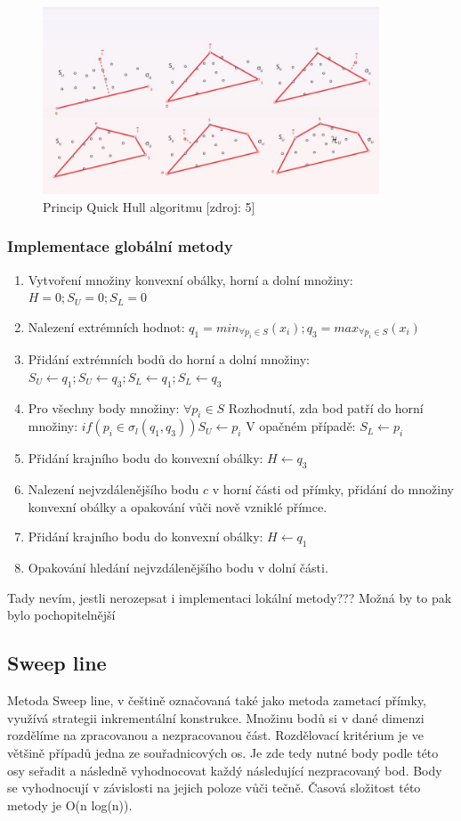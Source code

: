 \documentclass[a4paper, 12pt]{article}
\begin{document}
\begin{figure}[h!]
	\centering
	\includegraphics[width=10cm]{quickhull.jpg}
	\caption{Princip Quick Hull algoritmu [zdroj: 5]}
\end{figure}

\subsubsection{Implementace globální metody}
\begin{enumerate}
\item Vytvoření množiny konvexní obálky, horní a dolní množiny:  $H = 0; S_U = 0; S_L = 0 $ 
\item Nalezení extrémních hodnot:  $ q_1 =  min_{\forall p_i \in S}(x_i); q_3 =  max_{\forall p_i \in S}(x_i) $ 
\item Přidání extrémních bodů do horní a dolní množiny: $S_U \leftarrow q_1; S_U \leftarrow q_3; S_L \leftarrow q_1; S_L \leftarrow q_3 $
\item Pro všechny body množiny: $\forall p_i \in S  $
\subitem Rozhodnutí, zda bod patří do horní množiny: $ if(p_i \in \sigma_l(q_1, q_3)) S_U \leftarrow p_i  $
\subitem V opačném případě: $ S_L \leftarrow p_i  $
\item Přidání krajního bodu do konvexní obálky: $H \leftarrow q_3$
\item Nalezení nejvzdálenějšího bodu $c$ v horní části od přímky, přidání do množiny konvexní obálky a opakování vůči nově vzniklé přímce.
\item Přidání krajního bodu do konvexní obálky: $H \leftarrow q_1$
\item Opakování hledání nejvzdálenějšího bodu v dolní části.
\end{enumerate}

Tady nevím, jestli nerozepsat i implementaci lokální metody??? Možná by to pak bylo pochopitelnější


\subsection{Sweep line}
Metoda Sweep line, v češtině označovaná také jako metoda zametací přímky, využívá strategii inkrementální konstrukce. Množinu bodů si v dané dimenzi rozdělíme na zpracovanou a nezpracovanou část. Rozdělovací kritérium je ve většině případů jedna ze souřadnicových os. Je zde tedy nutné body podle této osy seřadit a následně vyhodnocovat každý následující nezpracovaný bod. Body se vyhodnocují v závislosti na jejich poloze vůči tečně. Časová složitost této metody je O(n log(n)). 
\end{document}
